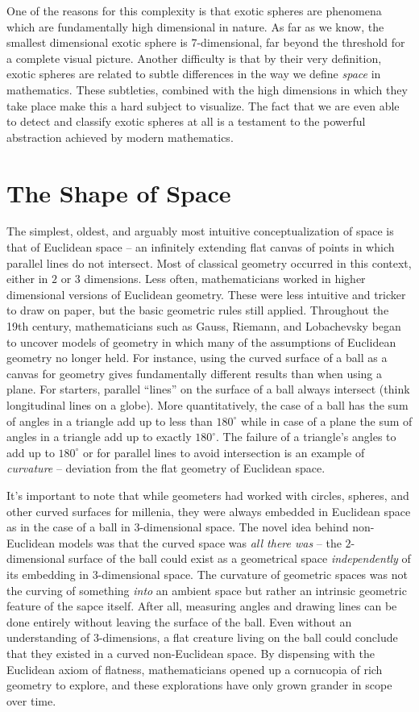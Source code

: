 One of the reasons for this complexity is that exotic spheres are phenomena which are fundamentally high dimensional in nature. As far as we know, the smallest dimensional exotic sphere is 7-dimensional, far beyond the threshold for a complete visual picture. Another difficulty is that by their very definition, exotic spheres are related to subtle differences in the way we define \emph{space} in mathematics. These subtleties, combined with the high dimensions in which they take place make this a hard subject to visualize. The fact that we are even able to detect and classify exotic spheres at all is a testament to the powerful abstraction achieved by modern mathematics. 

\section*{The Shape of Space}

The simplest, oldest, and arguably most intuitive conceptualization of space is that of Euclidean space -- an infinitely extending flat canvas of points in which parallel lines do not intersect. Most of classical geometry occurred in this context, either in $2$ or $3$ dimensions. 
Less often, mathematicians worked in higher dimensional versions of Euclidean geometry. These were less intuitive and tricker to draw on paper, but the basic geometric rules still applied.
Throughout the 19th century, mathematicians such as Gauss, Riemann, and Lobachevsky began to uncover models of geometry in which many of the assumptions of Euclidean geometry no longer held. 
For instance, using the curved surface of a ball as a canvas for geometry gives fundamentally different results than when using a plane. For starters, parallel ``lines'' on the surface of a ball always intersect (think longitudinal lines on a globe).
More quantitatively, the case of a ball has the sum of angles in a triangle add up to less than $180^\circ$ while in case of a plane the sum of angles in a triangle add up to exactly $180^\circ$. The failure of a triangle's angles to add up to $180^\circ$ or for parallel lines to avoid intersection is an example of \emph{curvature} -- deviation from the flat geometry of Euclidean space.

It's important to note that while geometers had worked with circles, spheres, and other curved surfaces for millenia, they were always embedded in Euclidean space as in the case of a ball in $3$-dimensional space. The novel idea behind non-Euclidean models was that the curved space was \emph{all there was} -- the $2$-dimensional surface of the ball could exist as a geometrical space \emph{independently} of its embedding in $3$-dimensional space. 
The curvature of geometric spaces was not the curving of something \emph{into} an ambient space but rather an intrinsic geometric feature of the sapce itself. After all, measuring angles and drawing lines can be done entirely without leaving the surface of the ball. Even without an understanding of $3$-dimensions, a flat creature living on the ball could conclude that they existed in a curved non-Euclidean space.
By dispensing with the Euclidean axiom of flatness, mathematicians opened up a cornucopia of rich geometry to explore, and these explorations have only grown grander in scope over time.


